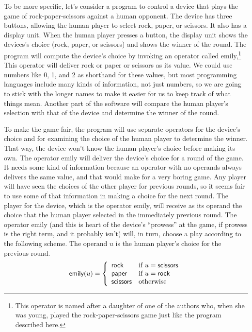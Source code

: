 To be more specific, let's consider a program to control
a device that plays the game of rock-paper-scissors against a human opponent.
The device has three buttons, allowing the human player to select rock, paper, or
scissors.  It also has a display unit.
When the human player presses a button,
the display unit shows the devices's choice (rock, paper, or scissors)
and shows the winner of the round.
The program will compute the device's choice
by invoking an operator called \textsf{emily},\footnote{This operator is
named after a daughter of one of the authors who, when she was young,
played the rock-paper-scissors game just like the program described here.}
This operator will deliver
rock or paper or scissors as its value.
We could use numbers like 0, 1, and 2 as shorthand for these values,
but most programming languages include many
kinds of information, not just numbers,
so we are going to stick with the longer names
to make it easier for us to keep track of what things mean.
Another part of the software will compare the human player's
selection with that of the device and determine the winner of the round.

To make the game fair, the program will use
separate operators for the device's choice and
for examining the choice of the human player to determine the winner.
That way, the device won't know the human player's choice before making its own.
The operator \textsf{emily} will deliver the device's choice for a round of the game.
It needs some kind of information because an operator with no operands
always delivers the same value, and that would make for a very boring game.
Any player will have seen the choices of the other player for
previous rounds, so it seems fair to use some of that information in
making a choice for the next round.
The player for the device, which is the operator \textsf{emily},
will receive as its operand the choice that the human player selected
in the immediately previous round.
The operator \textsf{emily}
(and this is heart of the device's ``prowess''
at the game, if prowess is the right term, and it probably isn't)
will, in turn, choose a play according to the following scheme.
The operand $u$ is the human player's choice for the previous round.
\begin{displaymath}
\textsf{emily}(u) =
   \left\{
        \begin{array}{ll}
        \mbox{\textsf{rock}}     & \mbox{if } u = \mbox{\textsf{scissors}} \\
        \mbox{\textsf{paper}}    & \mbox{if } u = \mbox{\textsf{rock}} \\
        \mbox{\textsf{scissors}} & \mbox{otherwise}
        \end{array}
   \right.
\end{displaymath}

